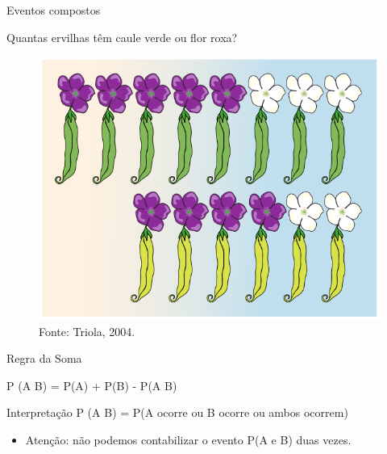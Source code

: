 \documentclass{beamer}
\begin{document}
\begin{frame}{Eventos compostos}
  \begin{example}
    Quantas ervilhas têm caule verde ou flor roxa?
  \end{example}
  \begin{figure}
    \centering
    \includegraphics[height=0.6\textheight]{Prob_I/ervilhas-genetica}
    \caption{Fonte: Triola, 2004.}
  \end{figure}
\end{frame}


\begin{frame}{Regra da Soma}
  \begin{definition}
    P (A  B) = P(A) + P(B) - P(A  B)
  \end{definition}
  \begin{block}{Interpretação}
    P (A  B) = P(A ocorre ou B ocorre ou ambos ocorrem)
  \end{block}
  \begin{itemize}
  \item Atenção: não podemos contabilizar o evento P(A e B) duas
    vezes.
  \end{itemize}
\end{frame}
\end{document}
